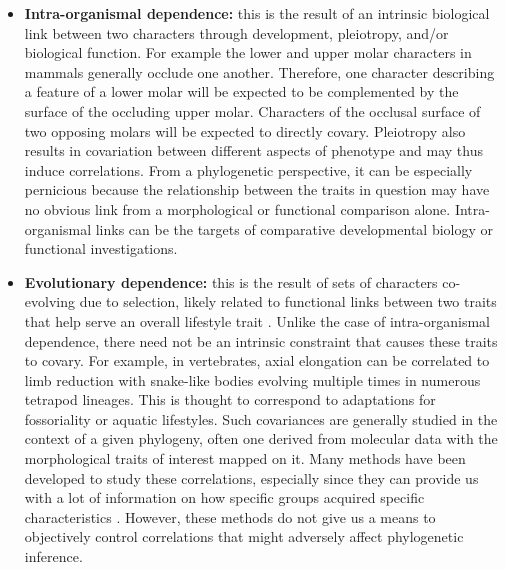 \documentclass[12pt,letterpaper]{article}
\begin{document}
\begin{itemize}
    \item \textbf{Intra-organismal dependence:} this is the result of an intrinsic biological link between two characters through development, pleiotropy, and/or biological function.
    For example the lower and upper molar characters in mammals generally occlude one another. 
    Therefore, one character describing a feature of a lower molar will be expected to be complemented by the surface of the occluding upper molar.
    Characters of the occlusal surface of two opposing molars will be expected to directly covary.
    Pleiotropy also results in covariation between different aspects of phenotype and may thus induce correlations. 
    From a phylogenetic perspective, it can be especially pernicious because the relationship between the traits in question may have no obvious link from a morphological or functional comparison alone. 
    Intra-organismal links can be the targets of comparative developmental biology \citep{goswami2010,kelly2010reduced,stoessel2013morphological,goswami2014macroevolutionary} or functional investigations. 

    \item \textbf{Evolutionary dependence:} this is the result of sets of characters co-evolving due to selection, likely related to functional links between two traits that help serve an overall lifestyle trait \citep{ClarkeMiddleton2008}. 
    Unlike the case of intra-organismal dependence, there need not be an intrinsic constraint that causes these traits to covary.
    For example, in vertebrates, axial elongation can be correlated to limb reduction with snake-like bodies evolving multiple times in numerous tetrapod lineages.
    This is thought to correspond to adaptations for fossoriality or aquatic lifestyles.
    Such covariances are generally studied in the context of a given phylogeny, often one derived from molecular data with the morphological traits of interest mapped on it.
    Many methods have been developed to study these correlations, especially since they can provide us with a lot of information on how specific groups acquired specific characteristics \citep{Lande1983,Maddison1990,Pagel1994,Pagel2006,Grabowski2016}.
    However, these methods do not give us a means to objectively control correlations that might adversely affect phylogenetic inference.


\end{itemize}
\end{document}
